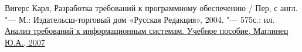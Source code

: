 \documentclass{../industrial-development}
\begin{document}
\begin{thebibliography}{99}
 Вигерс Карл, Разработка требований к программному обеспечению / Пер, с англ. "--- М.: Издательсш-торговый дом «Русская Редакция», 2004. "--- 575с.: ил.
 \href{http://ivan-shamaev.ru/wp-content/uploads/2013/06/Information-systems-analysis-and-requirements-analysis.pdf}{Анализ требований к информационным системам. Учебное пособие, Маглинец Ю.А., 2007}
\end{thebibliography}
\end{document}

